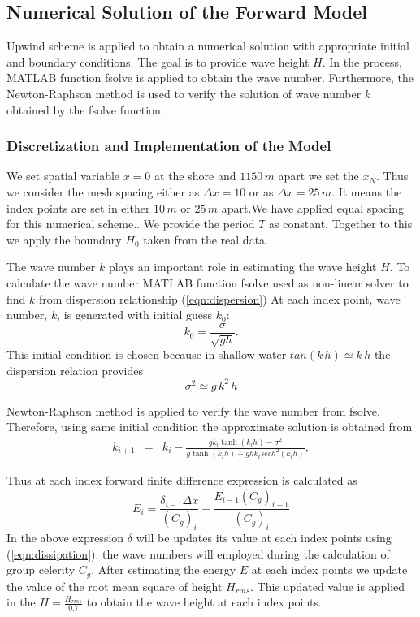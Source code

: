\subsection{Numerical Solution of the Forward Model}
Upwind scheme is applied to obtain a numerical solution with appropriate initial and boundary conditions. The goal is to provide wave height ${H}$. In the process, MATLAB function fsolve is applied to obtain the wave number. Furthermore, the Newton-Raphson method is used to verify the solution of wave number $k$ obtained by the fsolve function.

\subsubsection{Discretization and Implementation of the Model}
We set spatial variable $x=0$ at the shore and ${1150\,m}$ apart we set the ${x_{N}}$. Thus we consider the mesh spacing either as ${\Delta x=10}$ or as ${\Delta x=25\,m}$. It means the index points are set in either ${10\,m}$ or ${25\,m}$ apart.We have applied equal spacing for this numerical scheme.. We provide the period ${T}$ as constant. Together to this we apply the boundary ${H_0}$ taken from the real data. 

The wave number ${k}$ plays an important role in estimating the wave height ${H}$. To calculate the wave number MATLAB function fsolve used as non-linear solver to find ${k}$ from dispersion relationship (\ref{eqn:dispersion})
At each index point, wave number, $k$, is generated with initial guess $k_0$:
$$k_0=\frac{\sigma}{\sqrt{gh}}.$$
This initial condition is chosen because in shallow water ${tan(k\,h)\simeq k\,h}$ the dispersion relation provides \\
$${\sigma^2\simeq g\,k^2\,h}$$

Newton-Raphson method is applied to verify the wave number from fsolve. Therefore, using same initial condition the approximate solution is obtained from
\begin{eqnarray}
k_{i+1}& =& k_{i}-\frac{gk_i\tanh(k_ih)-\sigma^2}{g\tanh(k_ih)-ghk_i sech^2(k_ih)},
\end{eqnarray}


Thus at each index forward finite difference expression is calculated as
$$E_{i}=\frac{\delta_{i-1}\Delta x}{(C_g)_{i}}+\frac{E_{i-1}(C_g)_{i-1}}{(C_g)_{i}}$$
In the above expression ${\delta}$ will be updates its value at each index points using (\ref{eqn:dissipation}). the wave numbers will employed during the calculation of group celerity ${C_{g}}$. After estimating the energy ${E}$ at each index points we update the value of the root mean square of height ${H_{rms}}$. This updated value is applied in the ${H=\frac{H_{rms}}{0.7}}$ to obtain the wave height at each index points. 


